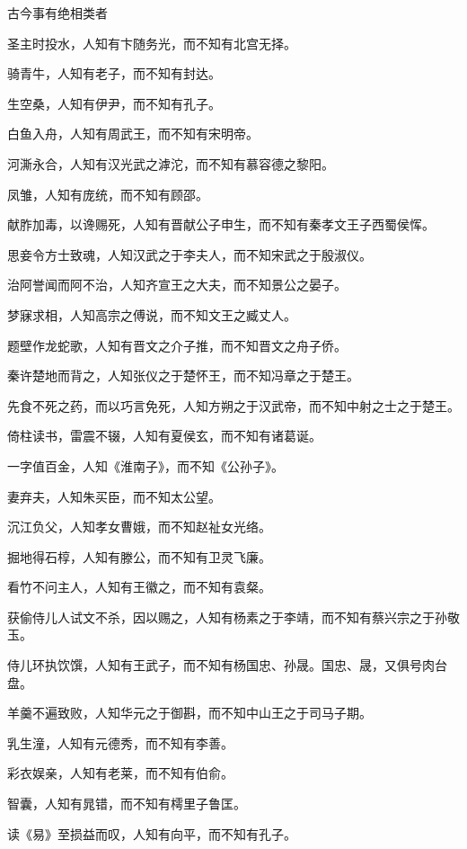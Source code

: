 \documentclass[a4paper,12pt,UTF8,twoside]{ctexbook}
\begin{document}
    古今事有绝相类者
    
    圣主时投水，人知有卞随务光，而不知有北宫无择。
    
    骑青牛，人知有老子，而不知有封达。
    
    生空桑，人知有伊尹，而不知有孔子。
    
    白鱼入舟，人知有周武王，而不知有宋明帝。
    
    河澌永合，人知有汉光武之滹沱，而不知有慕容德之黎阳。
    
    凤雏，人知有庞统，而不知有顾邵。
    
    献胙加毒，以谗赐死，人知有晋献公子申生，而不知有秦孝文王子西蜀侯恽。
    
    思妾令方士致魂，人知汉武之于李夫人，而不知宋武之于殷淑仪。
    
    治阿誉闻而阿不治，人知齐宣王之大夫，而不知景公之晏子。
    
    梦寐求相，人知高宗之傅说，而不知文王之臧丈人。
    
    题壁作龙蛇歌，人知有晋文之介子推，而不知晋文之舟子侨。
    
    秦许楚地而背之，人知张仪之于楚怀王，而不知冯章之于楚王。
    
    先食不死之药，而以巧言免死，人知方朔之于汉武帝，而不知中射之士之于楚王。
    
    倚柱读书，雷震不辍，人知有夏侯玄，而不知有诸葛诞。
    
    一字值百金，人知《淮南子》，而不知《公孙子》。
    
    妻弃夫，人知朱买臣，而不知太公望。
    
    沉江负父，人知孝女曹娥，而不知赵祉女光络。
    
    掘地得石椁，人知有滕公，而不知有卫灵飞廉。
    
    看竹不问主人，人知有王徽之，而不知有袁粲。
    
    获偷侍儿人试文不杀，因以赐之，人知有杨素之于李靖，而不知有蔡兴宗之于孙敬玉。
    
    侍儿环执饮馔，人知有王武子，而不知有杨国忠、孙晟。国忠、晟，又俱号肉台盘。
    
    羊羹不遍致败，人知华元之于御斟，而不知中山王之于司马子期。
    
    乳生潼，人知有元德秀，而不知有李善。
    
    彩衣娱亲，人知有老莱，而不知有伯俞。
    
    智囊，人知有晁错，而不知有樗里子鲁匡。
    
    读《易》至损益而叹，人知有向平，而不知有孔子。
    
\end{document}
